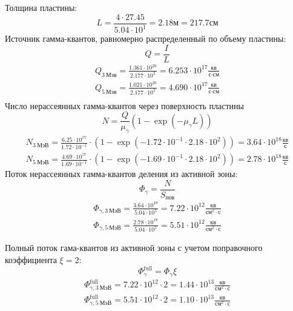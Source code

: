 \noindent Толщина пластины:
$$
L = \frac{4 \cdot 27.45} {5.04 \cdot 10^1} = 2.18 \text{м} = 217.7 \text{см}
$$
\noindent Источник гамма-квантов, равномерно распределенный по объему пластины:
\begin{equation}
        Q = \frac I L
\end{equation}
\begin{align*}
        Q_{3\ \text{Мэв}} = \frac{1.361 \cdot 10^{{ 20 }}}{2.177 \cdot 10^{{ 2 }}} = 6.253 \cdot 10^{{ 17 }} \frac{\text{кв}}{\text{с} \cdot \text{см}} \\
        Q_{5\ \text{Мэв}} = \frac{1.021 \cdot 10^{{ 20 }}}{2.177 \cdot 10^{{ 2 }}} = 4.690 \cdot 10^{{ 17 }} \frac{\text{кв}}{\text{с} \cdot \text{см}} \\
\end{align*}
\noindent Число нерассеянных гамма-квантов через поверхность пластины
\begin{equation}
        N = \frac{Q}{\mu_\gamma}\left(1 - \exp\left(-\mu_\gamma L\right)\right)
\end{equation}
\begin{align*}
        N_{3\ \text{МэВ}} = \frac{6.25 \cdot 10^{{ 17 }}}{1.72 \cdot 10^{{ -1 }}} \cdot \left( 1 - \exp\left(-1.72 \cdot 10^{{ -1 }}\cdot2.18 \cdot 10^{{ 2 }}\right)\right) = 3.64 \cdot 10^{{ 18 }} \frac{\text{кв}}{\text{с}} \\
        N_{5\ \text{МэВ}} = \frac{4.69 \cdot 10^{{ 17 }}}{1.69 \cdot 10^{{ -1 }}} \cdot \left( 1 - \exp\left(-1.69 \cdot 10^{{ -1 }}\cdot2.18 \cdot 10^{{ 2 }}\right)\right) = 2.78 \cdot 10^{{ 18 }} \frac{\text{кв}}{\text{с}}
\end{align*}
\noindent Поток нерассеянных гамма-квантов деления из активной зоны:
\begin{equation}
        \Phi_\gamma = \frac N {S_{\text{пов}}}
\end{equation}
\begin{align*}
        \Phi_{\gamma, 3\ \text{МэВ}} = \frac{3.64 \cdot 10^{{ 18 }}}{5.04 \cdot 10^{{ 5 }}}  = 7.22 \cdot 10^{{ 12 }} \frac{\text{кв}}{\text{см}^2 \cdot \text{с}} \\
        \Phi_{\gamma, 5\ \text{МэВ}} = \frac{2.78 \cdot 10^{{ 18 }}}{5.04 \cdot 10^{{ 5 }}}  = 5.51 \cdot 10^{{ 12 }} \frac{\text{кв}}{\text{см}^2 \cdot \text{с}} 
\end{align*}

\noindent Полный поток гама-квантов из активной зоны с учетом поправочного коэффициента $\xi=2$:
\begin{equation}
        \Phi_\gamma^{\text{full}} = \Phi_\gamma \xi
\end{equation}
\begin{align*}
        \Phi_{\gamma, 3\ \text{МэВ}}^{\text{full}} = 7.22 \cdot 10^{{ 12 }} \cdot 2  = 1.44 \cdot 10^{{ 13 }} \frac{\text{кв}}{\text{см}^2 \cdot \text{с}} \\
    \Phi_{\gamma, 5\ \text{МэВ}}^{\text{full}} = 5.51 \cdot 10^{{ 12 }} \cdot 2  = 1.10 \cdot 10^{{ 13 }} \frac{\text{кв}}{\text{см}^2 \cdot \text{с}} 
\end{align*}

